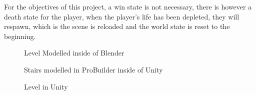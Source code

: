 \documentclass[11pt]{report}
\begin{document}
For the objectives of this project, a win state is not necessary, there is however a death state for the player, when the player's life has been depleted, they will respawn, which is the scene is reloaded and the world state is reset to the beginning.

\begin{figure}[H]
    \begin{minipage}{.5\textwidth}
        \centering
        \caption{Level Modelled inside of Blender}
    \end{minipage}
    \begin{minipage}{.5\textwidth}
        \centering
        \caption{Stairs modelled in ProBuilder inside of Unity}
    \end{minipage}
\end{figure}

\begin{figure}[H]
    \centering
    \caption{Level in Unity}
\end{figure}
\end{document}
